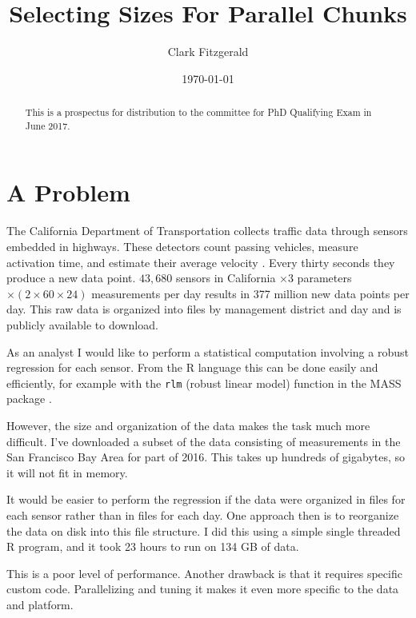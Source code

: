 \documentclass[12pt]{article}
\begin{document}
\title{Selecting Sizes For Parallel Chunks}
\date{\today}
\author{Clark Fitzgerald}
\maketitle

\begin{abstract}

    This is a prospectus for distribution to the committee for PhD
    Qualifying Exam in June 2017.

\end{abstract}


\section{A Problem}

The California Department of Transportation collects traffic
data through sensors embedded in highways. These detectors count passing
vehicles, measure activation time, and estimate their average velocity \cite{jia2001pems}.
Every thirty seconds they produce a new data point. $43,680$ sensors in
California $\times 3$ parameters $\times (2 \times 60 \times 24)$
measurements per day results in 377 million new data points per day.
This raw data is organized into files by management district and day and is
publicly available to download.

As an analyst I would like to perform a statistical computation involving a
robust regression for each sensor. From the R language this can be done
easily and efficiently, for example with the \texttt{rlm} (robust linear
model) function in the MASS package \cite{venables2013modern}.

However, the size and organization of the data makes the task much more
difficult.  I've downloaded a subset of the data consisting of measurements
in the San Francisco Bay Area for part of 2016. This takes up hundreds of
gigabytes, so it will not fit in memory.

It would be easier to perform the regression if the data were
organized in files for each sensor rather than in files for each day.  One
approach then is to reorganize the data on disk into this file structure. I
did this using a simple single threaded R program, and it took 23 hours to
run on 134 GB of data.

This is a poor level of performance.  Another drawback is that it
requires specific custom code. Parallelizing and tuning it makes it even
more specific to the data and platform.
\end{document}
